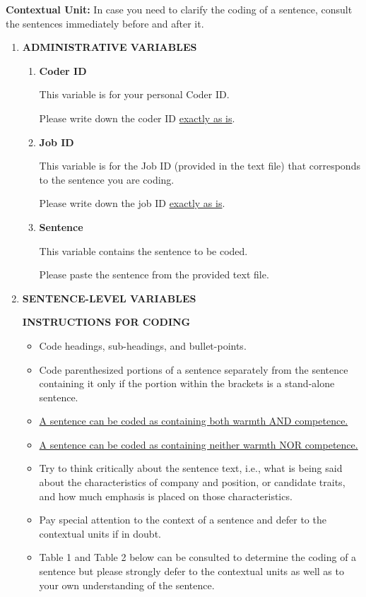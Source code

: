 \documentclass[Royal,sageapa,times]{sagej}
\begin{document}
\noindent\textbf{Contextual Unit:} In case you need to clarify the coding of a sentence, consult the sentences immediately before and after it.

\begin{enumerate}[label=\textbf{C\arabic*.}, wide=0pt, itemindent=0.25\textwidth]
    \item \textbf{ADMINISTRATIVE VARIABLES\label{administrative_variables}}
    \begin{enumerate}[label=\textbf{C\arabic{enumi}.\arabic*.}, wide=0pt]
        \item \noindent\textbf{Coder ID}

        This variable is for your personal Coder ID.

        {\small Please write down the coder ID \uline{exactly as is}.}

        \item \noindent\textbf{Job ID}

        This variable is for the Job ID (provided in the text file) that corresponds to the sentence you are coding.

        {\small Please write down the job ID \uline{exactly as is}.}

        \item \noindent\textbf{Sentence}

        This variable contains the sentence to be coded.

        {\small Please paste the sentence from the provided text file.}
        \end{enumerate}

    \item \textbf{SENTENCE-LEVEL VARIABLES\label{sentence_level_variables}}

    \textbf{INSTRUCTIONS FOR CODING\label{instructions_for_coding}}
    \begin{itemize}
        \item Code headings, sub-headings, and bullet-points.
        \item Code parenthesized portions of a sentence separately from the sentence containing it only if the portion within the brackets is a stand-alone sentence.
        \item \uline{A sentence can be coded as containing both warmth AND competence.}
        \item \uline{A sentence can be coded as containing neither warmth NOR competence.}
        \item Try to think critically about the sentence text, i.e., what is being said about the characteristics of company and position, or candidate traits, and how much emphasis is placed on those characteristics.
        \item Pay special attention to the context of a sentence and defer to the contextual units if in doubt.
        \item Table 1 and Table 2 below can be consulted to determine the coding of a sentence but please strongly defer to the contextual units as well as to your own understanding of the sentence.
        \end{itemize}


\end{enumerate}
\end{document}
